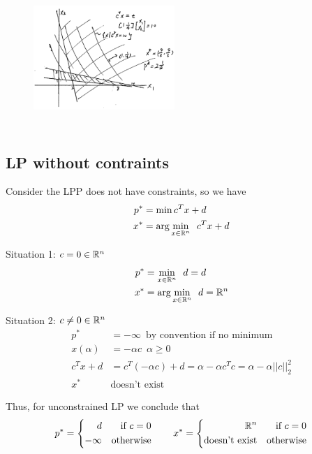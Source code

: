 \begin{figure}
	\centering
	\includegraphics[width=2.1in,height=2.1in]{figures/ch06/figure5.png}
\end{figure}



\subsection{LP without contraints}

Consider the LPP does not have constraints, so we have
\begin{align*}
	p^* &= \min c^Tx+d\\
	x^* &= \arg \min_{x\in \mathbb{R}^n} \,\,\, c^Tx+d
\end{align*}

\vspace{0.5cm}
Situation 1: $c = 0 \in \mathbb{R}^n$
\begin{align*}
	p^* &= \min_{x\in \mathbb{R}^n} \,\,\, d=d\\
	x^* &= \arg \min_{x\in \mathbb{R}^n} \,\,\, d = \mathbb{R}^n
\end{align*}

Situation 2: $c \neq 0 \in \mathbb{R}^n$
\begin{align*}
	p^* &= -\infty\,\,\, \text{by convention if no minimum}\\
	x(\alpha) &= -\alpha c \,\,\, \alpha \geq 0\\
	c^Tx + d &= c^T(-\alpha c) + d = \alpha - \alpha c^Tc = \alpha - \alpha||c||^2_2\\
	x^* &\text{doesn't exist}
\end{align*}

Thus, for unconstrained LP we conclude that
$$
p^*=\left\{
\begin{aligned}
d &  & \text{if } c=0 \\
-\infty &  & \text{otherwise}
\end{aligned}
\right.
\qquad
x^*=\left\{
\begin{aligned}
\mathbb{R}^n & &\text{if } c=0 \\
\text{doesn't exist} &  & \text{otherwise}
\end{aligned}
\right.
$$

